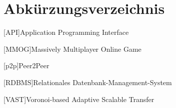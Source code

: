 \chapter*{Abkürzungsverzeichnis}

\vspace{\topskip}


\begin{acronym}[xxxxxxxxxxxx]
	\setlength{\itemsep}{-\parsep}
	\setlength{\itemindent}{1.5em}
	[API]{Application Programming Interface}






	
	


	[MMOG]{Massively Multiplayer Online Game}


	
	\vspace{\parsep}
	[p2p]{Peer2Peer}

	

	[RDBMS]{Relationales Datenbank-Management-System}
	
	


	\vspace{\parsep}
	[VAST]{Voronoi-based Adaptive Scalable Transfer}





\end{acronym}
